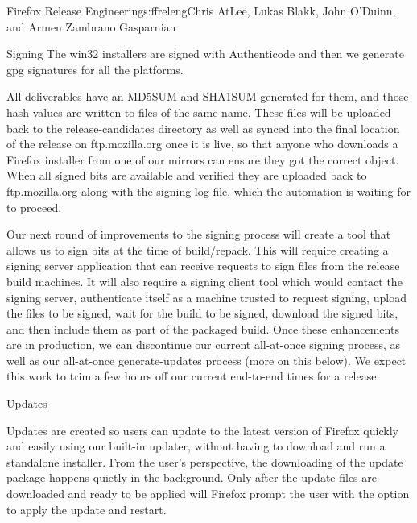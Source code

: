 \begin{aosachapter}{Firefox Release Engineering}{s:ffreleng}{Chris AtLee, Lukas Blakk, John O'Duinn, and Armen Zambrano Gasparnian}
\begin{aosasect1}{Signing}
The win32 installers are signed
with Authenticode and then we generate gpg signatures for all the
platforms.

All deliverables have an MD5SUM and SHA1SUM generated for them, and
those hash values are written to files of the same name.  These files
will be uploaded back to the release-candidates directory as well as
synced into the final location of the release on ftp.mozilla.org once
it is live, so that anyone who downloads a Firefox installer from one of our
mirrors can ensure they got the correct object. When all signed bits
are available and verified 
 they are uploaded back to ftp.mozilla.org along
with the signing log file, which the automation is waiting for to
proceed.

Our next round of improvements to the signing process will create a
tool that allows us to sign bits at the time of build/repack. This
will require creating a signing server application that can receive
requests to sign files from the release build machines.  It will also
require a signing client tool which would contact the signing
server, authenticate itself as a machine trusted to request signing,
upload the files to be signed, wait for the build to be signed,
download the signed bits, and then include them as part of the
packaged build.  Once these enhancements are in production, we can
discontinue our current all-at-once signing process, as well as our
all-at-once generate-updates process (more on this below). We expect this
work to trim a few hours off our current end-to-end times for a
release.
  
\end{aosasect1}

\begin{aosasect1}{Updates}

Updates are created so users can update to the latest version of
Firefox quickly and easily using our built-in updater, without having
to download and run a standalone installer.
From the user's perspective, the downloading of the update
package happens quietly in the background. Only after the update files
are downloaded and ready to be applied will Firefox prompt the user
with the option to apply the update and restart.


\end{aosasect1}
\end{aosachapter}
